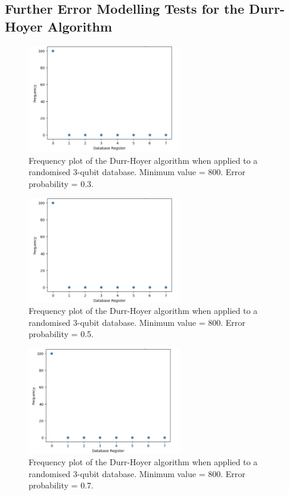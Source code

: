 \documentclass{article}[11pt]
\begin{document}
 \pagebreak
\subsection{Further Error Modelling Tests for the Durr-Hoyer Algorithm}\label{section:errorps}
\begin{figure}[H]
\centering
\includegraphics[width=0.6\textwidth]{Pictures/errorp03.png}
\caption{Frequency plot of the Durr-Hoyer algorithm when applied to a randomised 3-qubit database. Minimum value = 800. Error probability = 0.3.}
\label{fig:errorp03}
\end{figure}
\begin{figure}[H]
\centering
\includegraphics[width=0.6\textwidth]{Pictures/errorp05.png}
\caption{Frequency plot of the Durr-Hoyer algorithm when applied to a randomised 3-qubit database. Minimum value = 800. Error probability = 0.5.}
\label{fig:errorp05}
\end{figure}
\begin{figure}[H]
\centering
\includegraphics[width=0.6\textwidth]{Pictures/errorp07.png}
\caption{Frequency plot of the Durr-Hoyer algorithm when applied to a randomised 3-qubit database. Minimum value = 800. Error probability = 0.7.}
\label{fig:errorp07}
\end{figure}
\end{document}
